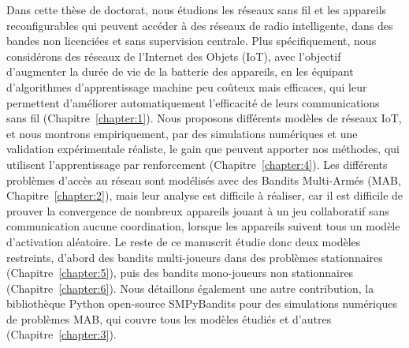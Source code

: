 \begin{resume_fr}




Dans cette thèse de doctorat, nous étudions les réseaux sans fil et les appareils reconfigurables qui peuvent accéder à des réseaux de radio intelligente, dans des bandes non licenciées et sans supervision centrale.
Plus spécifiquement, nous considérons des réseaux de l'Internet des Objets (IoT), avec l'objectif d'augmenter la durée de vie de la batterie des appareils, en les équipant d'algorithmes d'apprentissage machine peu coûteux mais efficaces, qui leur permettent d'améliorer automatiquement l'efficacité de leurs communications sans fil (Chapitre~\ref{chapter:1}).
Nous proposons différents modèles de réseaux IoT, et nous montrons empiriquement, par des simulations numériques et une validation expérimentale réaliste, le gain que peuvent apporter nos méthodes, qui utilisent l'apprentissage par renforcement (Chapitre~\ref{chapter:4}).
Les différents problèmes d'accès au réseau sont modélisés avec des Bandits Multi-Armés (MAB, Chapitre~\ref{chapter:2}), mais leur analyse est difficile à réaliser,
car il est difficile de prouver la convergence de nombreux appareils jouant à un jeu collaboratif sans communication aucune coordination, lorsque les appareils suivent tous un modèle d'activation aléatoire.
Le reste de ce manuscrit étudie donc deux modèles restreints, d'abord des bandits multi-joueurs dans des problèmes stationnaires (Chapitre~\ref{chapter:5}), puis des bandits mono-joueurs non stationnaires (Chapitre~\ref{chapter:6}).
Nous détaillons également une autre contribution, la bibliothèque Python open-source SMPyBandits pour des simulations numériques de problèmes MAB, qui couvre tous les modèles étudiés et d'autres (Chapitre~\ref{chapter:3}).



\end{resume_fr}
